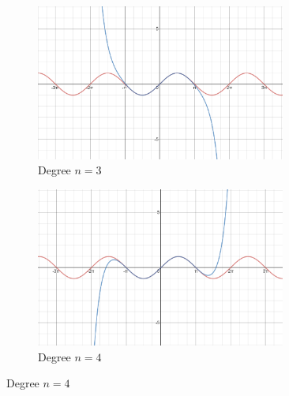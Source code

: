 \documentclass[a4paper,11pt]{article}
\theoremstyle{plain}
\begin{document}
\begin{figure}[hbtp]
	\begin{subfigure}{0.5\textwidth}
		\centering
		\includegraphics[width=0.9\textwidth]{taylor3}
		\caption{Degree $n=3$}
	\end{subfigure}
	\begin{subfigure}{0.5\textwidth}
		\centering
		\includegraphics[width=0.9\textwidth]{taylor4}
		\caption{Degree $n=4$}
	\end{subfigure}


\end{figure}
\end{document}

